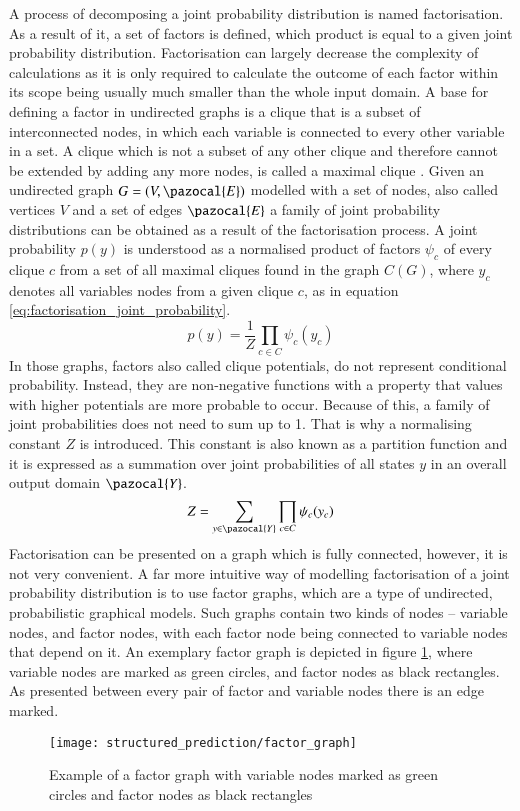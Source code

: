A process of decomposing a joint probability distribution is named factorisation. As a result of it, a set of factors is defined, which product is equal to a given joint probability distribution. Factorisation can largely decrease the complexity of calculations as it is only required to calculate the outcome of each factor within its scope being usually much smaller than the whole input domain. A base for defining a factor in undirected graphs is a clique that is a subset of interconnected nodes, in which each variable is connected to every other variable in a set. A clique which is not a subset of any other clique and therefore cannot be extended by adding any more nodes, is called a maximal clique \cite{clique}. Given an undirected graph $G=(V,\pazocal{E})$ modelled with a set of nodes, also called vertices $V$ and a set of edges $\pazocal{E}$ a family of joint probability distributions can be obtained as a result of the factorisation process. A joint probability $p(y)$ is understood as a normalised product of factors $\psi_{c}$ of every clique $c$ from a set of all maximal cliques found in the graph $C(G)$, where $y_c$ denotes all variables nodes from a given clique $c$, as in equation \ref{eq:factorisation_joint_probability}.
\begin{equation}
    \label{eq:factorisation_joint_probability}
    p(y)=\frac{1}{Z}\prod_{c\in C}\psi_{c}({y_c})
\end{equation}
In those graphs, factors also called clique potentials, do not represent conditional probability. Instead, they are non-negative functions with a property that values with higher potentials are more probable to occur. Because of this, a family of joint probabilities does not need to sum up to 1. That is why a normalising constant $Z$ is introduced. This constant is also known as a partition function and it is expressed as a summation over joint probabilities of all states $y$ in an overall output domain $\pazocal{Y}$.
\begin{equation}
    Z=\sum_{y\in \pazocal{Y}}\prod_{c\in C}\psi_{c}({y_c}) 
\end{equation}
Factorisation can be presented on a graph which is fully connected, however, it is not very convenient. A far more intuitive way of modelling factorisation of a joint probability distribution is to use factor graphs, which are a type of undirected, probabilistic graphical models. Such graphs contain two kinds of nodes – variable nodes, and factor nodes, with each factor node being connected to variable nodes that depend on it. An exemplary factor graph is depicted in figure \ref{fig:factor_graph}, where variable nodes are marked as green circles, and factor nodes as black rectangles. As presented between every pair of factor and variable nodes there is an edge marked.
\begin{figure}[ht]
    \centering
    \texttt{[image: structured\_prediction/factor\_graph]}
    \caption{Example of a factor graph with variable nodes marked as green circles and factor nodes as black rectangles}
     \label{fig:factor_graph}
\end{figure}

